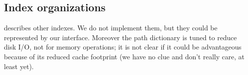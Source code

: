\documentclass[preprint,authoryear,10pt]{sigplanconf}
\begin{document}
\subsection{Index organizations}

\citet{Lee98} describes other indexes. We do not implement them, but
they could be represented by our interface. Moreover the path dictionary
is tuned to reduce disk I/O, not for memory operations; it is not clear
if it could be advantageous because of its reduced cache footprint (we
have no clue and don't really care, at least yet).


%
\end{document}
